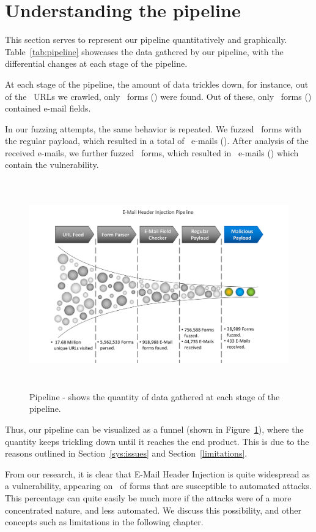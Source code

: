 \section[The Pipeline]{Understanding the pipeline}
This section serves to represent our pipeline quantitatively and graphically. Table~\ref{tab:pipeline} showcases the data gathered by our pipeline, with the differential changes at each stage of the pipeline. 

At each stage of the pipeline, the amount of data trickles down, for instance, out of the \urls\ URLs we crawled, only \forms\ forms (\formsDelta) were found. Out of these, only \emailforms\ forms (\emailformsDelta) contained e-mail fields.

In our fuzzing attempts, the same behavior is repeated. We fuzzed \fuzzed\ forms with the regular payload, which resulted in a total of \recd\ e-mails (\recdDelta). After analysis of the received e-mails, we further fuzzed \fuzzed\ forms, which resulted in \success\ e-mails (\successDelta) which contain the vulnerability.


\begin{figure}
	\centering
	\includegraphics[width=16cm, height=9cm]{Results/emailheaderpipeline}
	\caption[]{Pipeline - shows the quantity of data gathered at each stage of the pipeline.}
	\label{fig:pipeline}
\end{figure}

Thus, our pipeline can be visualized as a funnel (shown in Figure~\ref{fig:pipeline}), where the quantity keeps trickling down until it reaches the end product. This is due to the reasons outlined in Section~\ref{sys:issues} and Section~\ref{limitations}.

From our research, it is clear that E-Mail Header Injection is quite widespread as a vulnerability, appearing on \successDelta\ of forms that are susceptible to automated attacks. This percentage can quite easily be much more if the attacks were of a more concentrated nature, and less automated. We discuss this possibility, and other concepts such as limitations in the following chapter.
